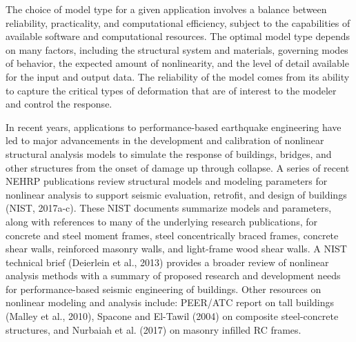 The choice of model type for a given application involves a balance between reliability, practicality, and computational efficiency, subject to the capabilities of available software and computational resources. The optimal model type depends on many factors, including the structural system and materials, governing modes of behavior, the expected amount of nonlinearity, and the level of detail available for the input and output data. The reliability of the model comes from its ability to capture the critical types of deformation that are of interest to the modeler and control the response. 

In recent years, applications to performance-based earthquake engineering have led to major advancements in the development and calibration of nonlinear structural analysis models to simulate the response of buildings, bridges, and other structures from the onset of damage up through collapse. A series of recent NEHRP publications review structural models and modeling parameters for nonlinear analysis to support seismic evaluation, retrofit, and design of buildings (NIST, 2017a-c). These NIST documents summarize models and parameters, along with references to many of the underlying research publications, for concrete and steel moment frames, steel concentrically braced frames, concrete shear walls, reinforced masonry walls, and light-frame wood shear walls. A NIST technical brief (Deierlein et al., 2013) provides a broader review of nonlinear analysis methods with a summary of proposed research and development needs for performance-based seismic engineering of buildings. Other resources on nonlinear modeling and analysis include: PEER/ATC report on tall buildings (Malley et al., 2010), Spacone and El-Tawil (2004) on composite steel-concrete structures, and Nurbaiah et al. (2017) on masonry infilled RC frames.

